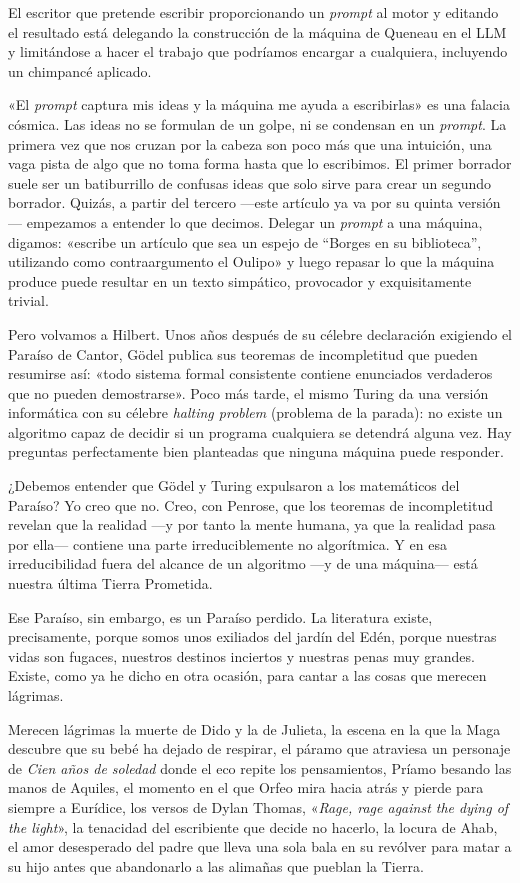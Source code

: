 \documentclass[11pt,a4paper]{article}
\begin{document}
El escritor que pretende escribir proporcionando un \emph{prompt} al motor y editando el resultado está delegando la construcción de la máquina de Queneau en el LLM y limitándose a hacer el trabajo que podríamos encargar a cualquiera, incluyendo un chimpancé aplicado. 


«El \emph{prompt} captura mis ideas y la máquina me ayuda a escribirlas» es una falacia cósmica. Las ideas no se formulan de un golpe, ni se condensan en un \emph{prompt}. La primera vez que nos cruzan por la cabeza son poco más que una intuición, una vaga pista de algo que no toma forma hasta que lo escribimos. El primer borrador suele ser un batiburrillo de confusas ideas que solo sirve para crear un segundo borrador. Quizás, a partir del tercero ---este artículo ya va por su quinta versión--- empezamos a entender lo que decimos. Delegar un \emph{prompt} a una máquina, digamos: «escribe un artículo que sea un espejo de “Borges en su biblioteca”, utilizando como contraargumento el Oulipo» y luego repasar lo que la máquina produce puede resultar en un texto simpático, provocador y exquisitamente trivial. 

Pero volvamos a Hilbert. Unos años después de su célebre declaración exigiendo el Paraíso de Cantor, Gödel publica sus teoremas de incompletitud que pueden resumirse así: «todo sistema formal consistente contiene enunciados verdaderos que no pueden demostrarse». Poco más tarde, el mismo Turing da una versión informática con su célebre \emph{halting problem} (problema de la parada): no existe un algoritmo capaz de decidir si un programa cualquiera se detendrá alguna vez. Hay preguntas perfectamente bien planteadas que ninguna máquina puede responder.

¿Debemos entender que Gödel y Turing expulsaron a los matemáticos del Paraíso? Yo creo que no. Creo, con Penrose, que los teoremas de incompletitud revelan que la realidad ---y por tanto la mente humana, ya que la realidad pasa por ella--- contiene una parte irreduciblemente no algorítmica. Y en esa irreducibilidad fuera del alcance de un algoritmo ---y de una máquina--- está nuestra última Tierra Prometida.

Ese Paraíso, sin embargo, es un Paraíso perdido. La literatura existe, precisamente, porque somos unos exiliados del jardín del Edén, porque nuestras vidas son fugaces, nuestros destinos inciertos y nuestras penas muy grandes. Existe, como ya he dicho en otra ocasión, para cantar a las cosas que merecen lágrimas. 

Merecen lágrimas la muerte de Dido y la de Julieta, la escena en la que la Maga descubre que su bebé ha dejado de respirar, el páramo que atraviesa un personaje de \emph{Cien años de soledad} donde el eco repite los pensamientos, Príamo besando las manos de Aquiles, el momento en el que Orfeo mira hacia atrás y pierde para siempre a Eurídice, los versos de Dylan Thomas, «\emph{Rage, rage against the dying of the light}», la tenacidad del escribiente que decide no hacerlo, la locura de Ahab, el amor desesperado del padre que lleva una sola bala en su revólver para matar a su hijo antes que abandonarlo a las alimañas que pueblan la Tierra.
\end{document}
